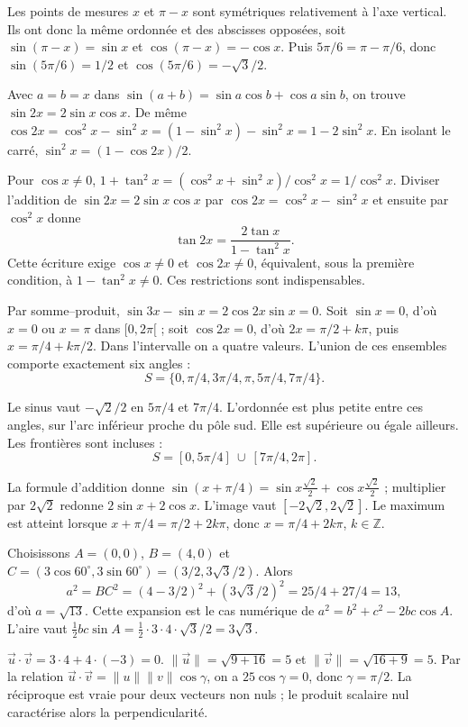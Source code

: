 Les points de mesures $x$ et $\pi-x$ sont symétriques relativement à l'axe vertical. Ils ont donc la même ordonnée et des abscisses opposées, soit $\sin(\pi-x)=\sin x$ et $\cos(\pi-x)=-\cos x$. Puis $5\pi/6=\pi-\pi/6$, donc $\boxed{\sin(5\pi/6)=1/2}$ et $\boxed{\cos(5\pi/6)=-\sqrt3/2}$.

Avec $a=b=x$ dans $\sin(a+b)=\sin a\cos b+\cos a\sin b$, on trouve $\sin2x=2\sin x\cos x$. De même $\cos2x=\cos^2x-\sin^2x=(1-\sin^2x)-\sin^2x=1-2\sin^2x$. En isolant le carré, $\boxed{\sin^2x=(1-\cos2x)/2}$.

Pour $\cos x\ne0$, $1+\tan^2x=(\cos^2x+\sin^2x)/\cos^2x=1/\cos^2x$. Diviser l'addition de $\sin2x=2\sin x\cos x$ par $\cos2x=\cos^2x-\sin^2x$ et ensuite par $\cos^2x$ donne
\[\tan2x=\frac{2\tan x}{1-\tan^2x}.\]
Cette écriture exige $\cos x\ne0$ et $\cos2x\ne0$, équivalent, sous la première condition, à $1-\tan^2x\ne0$. Ces restrictions sont indispensables.

Par somme--produit, $\sin3x-\sin x=2\cos2x\sin x=0$. Soit $\sin x=0$, d'où $x=0$ ou $x=\pi$ dans $[0,2\pi[$ ; soit $\cos2x=0$, d'où $2x=\pi/2+k\pi$, puis $x=\pi/4+k\pi/2$. Dans l'intervalle on a quatre valeurs. L'union de ces ensembles comporte exactement six angles :
\[\boxed{S=\{0,\pi/4,3\pi/4,\pi,5\pi/4,7\pi/4\}.}\]

Le sinus vaut $-\sqrt2/2$ en $5\pi/4$ et $7\pi/4$. L'ordonnée est plus petite entre ces angles, sur l'arc inférieur proche du pôle sud. Elle est supérieure ou égale ailleurs. Les frontières sont incluses :
\[\boxed{S=[0,5\pi/4]\ \cup\ [7\pi/4,2\pi].}\]

La formule d'addition donne $\sin(x+\pi/4)=\sin x\frac{\sqrt2}2+\cos x\frac{\sqrt2}2$ ; multiplier par $2\sqrt2$ redonne $2\sin x+2\cos x$. L'image vaut $\boxed{[-2\sqrt2,2\sqrt2]}$. Le maximum est atteint lorsque $x+\pi/4=\pi/2+2k\pi$, donc $\boxed{x=\pi/4+2k\pi}$, $k\in\mathbb Z$.

Choisissons $A=(0,0)$, $B=(4,0)$ et $C=(3\cos60^\circ,3\sin60^\circ)=(3/2,3\sqrt3/2)$. Alors
\[a^2=BC^2=(4-3/2)^2+(3\sqrt3/2)^2=25/4+27/4=13,\]
d'où $\boxed{a=\sqrt{13}}$. Cette expansion est le cas numérique de $a^2=b^2+c^2-2bc\cos A$. L'aire vaut $\frac12bc\sin A=\frac12\cdot3\cdot4\cdot\sqrt3/2=\boxed{3\sqrt3}$.

$\vec u\cdot\vec v=3\cdot4+4\cdot(-3)=0$. $\|\vec u\|=\sqrt{9+16}=5$ et $\|\vec v\|=\sqrt{16+9}=5$. Par la relation $\vec u\cdot\vec v=\|u\|\|v\|\cos\gamma$, on a $25\cos\gamma=0$, donc $\boxed{\gamma=\pi/2}$. La réciproque est vraie pour deux vecteurs non nuls ; le produit scalaire nul caractérise alors la perpendicularité.


